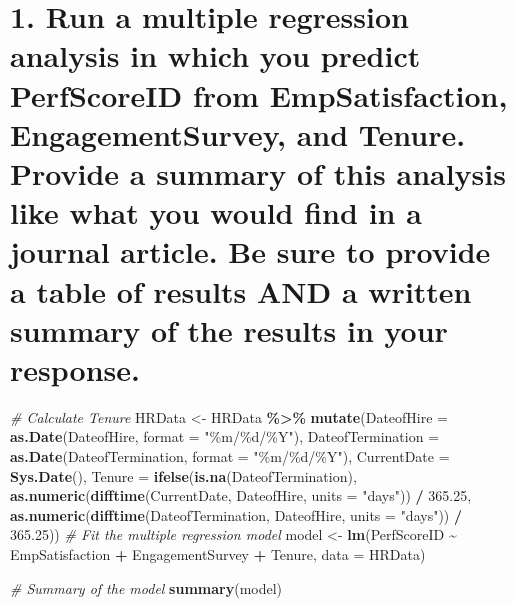 \documentclass[
]{article}
\newenvironment{Shaded}{\begin{snugshade}}{\end{snugshade}}
\newcommand{\AttributeTok}[1]{\textcolor[rgb]{0.13,0.29,0.53}{#1}}
\newcommand{\CommentTok}[1]{\textcolor[rgb]{0.56,0.35,0.01}{\textit{#1}}}
\newcommand{\FloatTok}[1]{\textcolor[rgb]{0.00,0.00,0.81}{#1}}
\newcommand{\FunctionTok}[1]{\textcolor[rgb]{0.13,0.29,0.53}{\textbf{#1}}}
\newcommand{\NormalTok}[1]{#1}
\newcommand{\OtherTok}[1]{\textcolor[rgb]{0.56,0.35,0.01}{#1}}
\newcommand{\SpecialCharTok}[1]{\textcolor[rgb]{0.81,0.36,0.00}{\textbf{#1}}}
\newcommand{\StringTok}[1]{\textcolor[rgb]{0.31,0.60,0.02}{#1}}
\begin{document}
\section{1. Run a multiple regression analysis in which you predict
PerfScoreID from EmpSatisfaction, EngagementSurvey, and Tenure. Provide
a summary of this analysis like what you would find in a journal
article. Be sure to provide a table of results AND a written summary of
the results in your
response.}\label{run-a-multiple-regression-analysis-in-which-you-predict-perfscoreid-from-empsatisfaction-engagementsurvey-and-tenure.-provide-a-summary-of-this-analysis-like-what-you-would-find-in-a-journal-article.-be-sure-to-provide-a-table-of-results-and-a-written-summary-of-the-results-in-your-response.}

\begin{Shaded}
\begin{Highlighting}[]
\CommentTok{\# Calculate Tenure}
\NormalTok{HRData }\OtherTok{\textless{}{-}}\NormalTok{ HRData }\SpecialCharTok{\%\textgreater{}\%}
    \FunctionTok{mutate}\NormalTok{(}\AttributeTok{DateofHire =} \FunctionTok{as.Date}\NormalTok{(DateofHire, }\AttributeTok{format =} \StringTok{"\%m/\%d/\%Y"}\NormalTok{),}
           \AttributeTok{DateofTermination =} \FunctionTok{as.Date}\NormalTok{(DateofTermination, }\AttributeTok{format =} \StringTok{"\%m/\%d/\%Y"}\NormalTok{),}
           \AttributeTok{CurrentDate =} \FunctionTok{Sys.Date}\NormalTok{(),}
           \AttributeTok{Tenure =} \FunctionTok{ifelse}\NormalTok{(}\FunctionTok{is.na}\NormalTok{(DateofTermination), }
                           \FunctionTok{as.numeric}\NormalTok{(}\FunctionTok{difftime}\NormalTok{(CurrentDate, DateofHire, }\AttributeTok{units =} \StringTok{"days"}\NormalTok{)) }\SpecialCharTok{/} \FloatTok{365.25}\NormalTok{,}
                           \FunctionTok{as.numeric}\NormalTok{(}\FunctionTok{difftime}\NormalTok{(DateofTermination, DateofHire, }\AttributeTok{units =} \StringTok{"days"}\NormalTok{)) }\SpecialCharTok{/} \FloatTok{365.25}\NormalTok{))}
\CommentTok{\# Fit the multiple regression model}
\NormalTok{model }\OtherTok{\textless{}{-}} \FunctionTok{lm}\NormalTok{(PerfScoreID }\SpecialCharTok{\textasciitilde{}}\NormalTok{ EmpSatisfaction }\SpecialCharTok{+}\NormalTok{ EngagementSurvey }\SpecialCharTok{+}\NormalTok{ Tenure, }\AttributeTok{data =}\NormalTok{ HRData)}

\CommentTok{\# Summary of the model}
\FunctionTok{summary}\NormalTok{(model)}
\end{Highlighting}
\end{Shaded}
\end{document}
